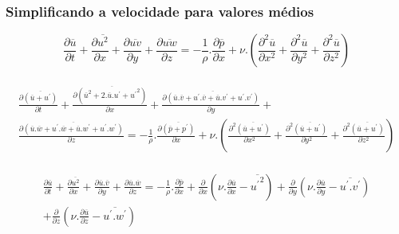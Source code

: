\documentclass[xcolor=dvipsnames,10pt,aspectratio=169]{beamer}
\begin{document}
		
				\begin{frame}
		\frametitle{Simplificando a velocidade para valores médios}
		\begin{equation}
		\frac{\partial \overline{u}}{\partial t} + \frac{\partial \overline{u^2}}{\partial x} + \frac{\partial \overline{uv}}{\partial y} + \frac{\partial \overline{uw}}{\partial z} = - \frac{1}{\rho} . \frac{\partial \overline{p}}{\partial x} + \nu . \left( \frac{\partial^2 \overline{u}}{\partial {x^2}} + \frac{\partial^2 \overline{u}}{\partial y^2} + \frac{\partial^2 \overline{u}}{\partial z^2}   \right)
		\end{equation}
		\\
		\begin{equation}
		\begin{split}
		\frac{\partial \overline{(\overline{u} + u^\prime)}}{\partial t} + \frac{\partial \overline{(\overline{u}^2 + 2 . \overline{u} . u^\prime + {u^\prime}^2)}}{\partial x} + \frac{\partial \overline{(\overline{u}.\overline{v} + u^\prime . \overline{v} + \overline{u} . v^\prime + u^\prime . v ^\prime )}}{\partial y} + \\
		\frac{\partial \overline{(\overline{u}.\overline{w} + u^\prime . \overline{w} + \overline{u} . w^\prime + u^\prime . w ^\prime )}}{\partial z} = - \frac{1}{\rho} . \frac{\partial \overline{(\overline{p} + p ^\prime)}}{\partial x} + \nu . \left( \frac{\partial^2 \overline{(\overline{u} + u^\prime)}}{\partial {x^2}} + \frac{\partial^2 \overline{(\overline{u} + u^\prime)}}{\partial y^2} + \frac{\partial^2 \overline{(\overline{u} + u^\prime)}}{\partial z^2}   \right)
		\end{split}
		\end{equation}
		\\
		\begin{equation}
		\begin{split}
		\frac{\partial \overline{u}}{\partial t} + \frac{\partial \overline{u^2}}{\partial x} + \frac{\partial \overline{u}.\overline{v}}{\partial y} + \frac{\partial \overline{u}.\overline{w}}{\partial z} =  - \frac{1}{\rho} . \frac{\partial \overline{{p}}}{\partial x} + \frac{\partial}{\partial x} \left( \nu.\frac{\partial \overline{u}}{\partial x} - \overline{{u^\prime}^2}\right) + \frac{\partial}{\partial y} \left( \nu.\frac{\partial \overline{u}}{\partial y} - \overline{{u^\prime . v^\prime}}\right) \\
		+ \frac{\partial}{\partial z} \left( \nu . \frac{\partial \overline{u}}{\partial z} - \overline{ u ^\prime . w ^\prime} \right)
		\end{split}
		\end{equation}
	\end{frame}
	
\end{document}
